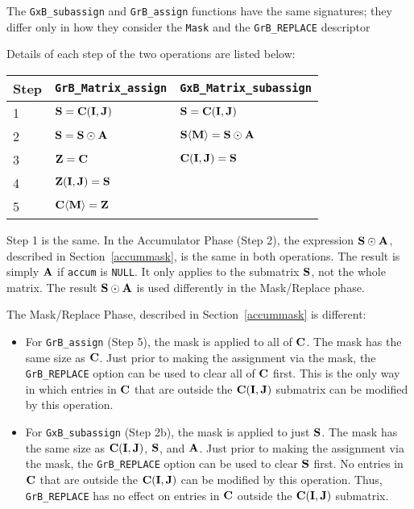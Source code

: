 \documentclass[12pt]{article}
\begin{document}
The \verb'GxB_subassign' and \verb'GrB_assign' functions have the same
signatures; they differ only in how they consider the \verb'Mask' and the
\verb'GrB_REPLACE' descriptor

Details of each step of the two operations are listed below:

\vspace{0.1in}
\begin{tabular}{lll}
\hline
Step & \verb'GrB_Matrix_assign'                & \verb'GxB_Matrix_subassign'                        \\
\hline
1 & ${\bf S} = {\bf C(I,J)}$                & ${\bf S} = {\bf C(I,J)}$                              \\
2 & ${\bf S} = {\bf S} \odot {\bf A}$       & ${\bf S \langle M \rangle} = {\bf S} \odot {\bf A}$   \\
3 & ${\bf Z} = {\bf C}$                     & ${\bf C(I,J)}= {\bf S}$                               \\
4 & ${\bf Z(I,J)} = {\bf S}$                &                                                       \\
5 & ${\bf C \langle M \rangle = Z}$         &                                                       \\
\hline
\end{tabular}
\vspace{0.1in}

Step 1 is the same.  In the Accumulator Phase (Step 2), the expression
${\bf S} \odot {\bf A}$,
described in Section~\ref{accummask}, is the same in both
operations.  The result is simply ${\bf A}$ if \verb'accum' is \verb'NULL'.  It
only applies to the submatrix ${\bf S}$, not the whole matrix.
The result ${\bf S} \odot {\bf A}$ is used differently in the Mask/Replace
phase.

The Mask/Replace Phase, described in Section~\ref{accummask} is different:
\begin{itemize}
\item
    For \verb'GrB_assign' (Step 5), the mask is applied to all of ${\bf
    C}$.  The mask has the same size as ${\bf C}$.  Just prior to making the
    assignment via the mask, the \verb'GrB_REPLACE' option can be used to clear
    all of ${\bf C}$ first.  This is the only way in which entries in ${\bf C}$ that
    are outside the ${\bf C(I,J)}$ submatrix can be modified by this operation.

\item
    For \verb'GxB_subassign' (Step 2b), the mask is applied to just
    ${\bf S}$.  The mask has the same size as ${\bf C(I,J)}$, ${\bf S}$, and
    ${\bf A}$.  Just prior to making the assignment via the mask, the
    \verb'GrB_REPLACE' option can be used to clear ${\bf S}$ first.  No entries
    in ${\bf C}$ that are outside the ${\bf C(I,J)}$ can be modified by this
    operation.  Thus, \verb'GrB_REPLACE' has no effect on entries in ${\bf C}$
    outside the ${\bf C(I,J)}$ submatrix.

\end{itemize}
\end{document}
